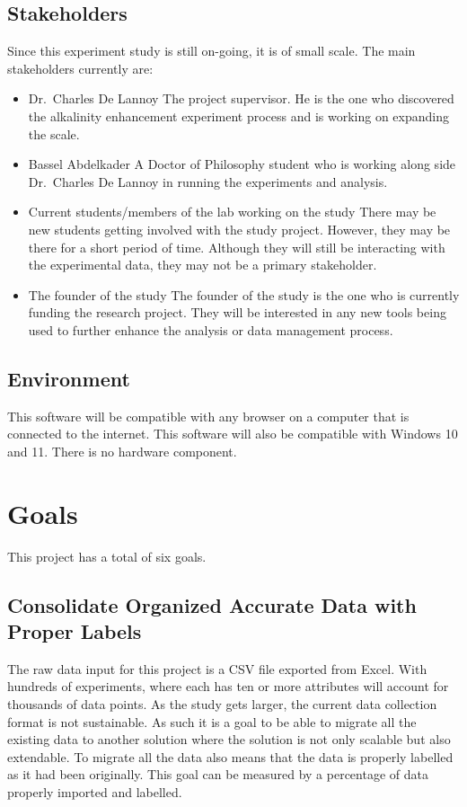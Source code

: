 \documentclass{article}
\begin{document}
\subsection{Stakeholders}
Since this experiment study is still on-going, it is of small scale. \newline
The main stakeholders currently are:
\begin{itemize}
    \item Dr.\ Charles De Lannoy \newline
        The project supervisor. He is the one who discovered the alkalinity
        enhancement experiment process and is working on expanding the scale. 
    \item Bassel Abdelkader \newline
        A Doctor of Philosophy student who is working along side Dr.\ Charles De
        Lannoy in running the experiments and analysis. 
    \item Current students/members of the lab working on the study \newline
        There may be new students getting involved with the study project.
        However, they may be there for a short period of time. Although they
        will still be interacting with the experimental data, they may not be a
        primary stakeholder. 
    \item The founder of the study \newline
        The founder of the study is the one who is currently funding the
        research project. They will be interested in any new tools being used to
        further enhance the analysis or data management process.
\end{itemize}

\subsection{Environment}
This software will be compatible with any browser on a computer that is
connected to the internet. This software will also be compatible with Windows 10
and 11. There is no hardware component.


\section{Goals}
This project has a total of six goals.
\subsection{Consolidate Organized Accurate Data with Proper Labels}
The raw data input for this project is a CSV file exported from Excel. With
hundreds of experiments, where each has ten or more attributes will account for
thousands of data points. As the study gets larger, the current data collection
format is not sustainable. As such it is a goal to be able to migrate all the
existing data to another solution where the solution is not only scalable but
also extendable. To migrate all the data also means that the data is properly
labelled as it had been originally. This goal can be measured by a percentage of
data properly imported and labelled.
\end{document}
